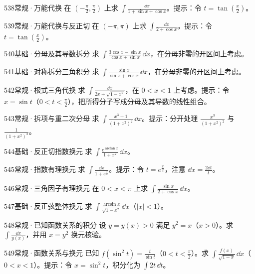 \begin{exercise}{538}{常规·万能代换}
在 $(-\frac{\pi}{2},\frac{\pi}{2})$ 上求 $\int\frac{\dd x}{1+\sin x+\cos x}$。提示：令 $t=\tan(\frac{x}{2})$。
\end{exercise}
\begin{exercise}{539}{常规·万能代换与反正切}
在 $(-\pi,\pi)$ 上求 $\int\frac{\dd x}{2+\cos x}$。提示：令 $t=\tan(\frac{x}{2})$。
\end{exercise}
\begin{exercise}{540}{基础·分母及其导数拆分}
求 $\int\frac{3\cos x-\sin x}{\cos x+\sin x}\,\dd x$，在分母非零的开区间上考虑。
\end{exercise}
\begin{exercise}{541}{基础·对称拆分三角积分}
求 $\int\frac{\sin x}{\sin x+\cos x}\,\dd x$，在分母非零的开区间上考虑。
\end{exercise}
\begin{exercise}{542}{常规·根式三角代换}
求 $\int\frac{\dd x}{2x+\sqrt{1-x^2}}$，在 $0<x<1$ 上考虑。提示：令 $x=\sin t$（$0<t<\frac{\pi}{2}$），把所得分子写成分母及其导数的线性组合。
\end{exercise}
\begin{exercise}{543}{常规·拆项与重二次分母}
求 $\int\frac{x^3+1}{(1+x^2)^2}\,\dd x$。提示：分开处理 $\frac{x^3}{(1+x^2)^2}$ 与 $\frac{1}{(1+x^2)^2}$。
\end{exercise}
\begin{exercise}{544}{基础·反正切指数换元}
求 $\int\frac{e^{\arctan x}}{1+x^2}\,\dd x$。
\end{exercise}
\begin{exercise}{545}{常规·指数有理换元}
求 $\int\frac{\dd x}{1+e^{\frac{x}{2}}}$。提示：令 $t=e^{\frac{x}{2}}$，注意 $\dd x=\frac{2\dd t}{t}$。
\end{exercise}
\begin{exercise}{546}{常规·三角因子有理换元}
在 $0<x<\pi$ 上求 $\int\frac{\sin x}{2+\cos x}\,\dd x$。
\end{exercise}
\begin{exercise}{547}{基础·反正弦整体换元}
求 $\int\frac{\arcsin x}{\sqrt{1-x^2}}\,\dd x$（$|x|<1$）。
\end{exercise}
\begin{exercise}{548}{常规·已知函数关系的积分}
设 $y=y(x)>0$ 满足 $y^2=x$（$x>0$）。求 $\int\frac{\dd x}{y(x)}$，并用 $x=y^2$ 换元核验。
\end{exercise}
\begin{exercise}{549}{常规·函数关系与换元}
已知 $f(\sin^2t)=\frac{t}{\sin t}$（$0<t<\frac{\pi}{2}$）。求 $\int\frac{f(x)}{\sqrt{1-x}}\,\dd x$（$0<x<1$）。提示：令 $x=\sin^2t$，积分化为 $\int2t\,\dd t$。
\end{exercise}
